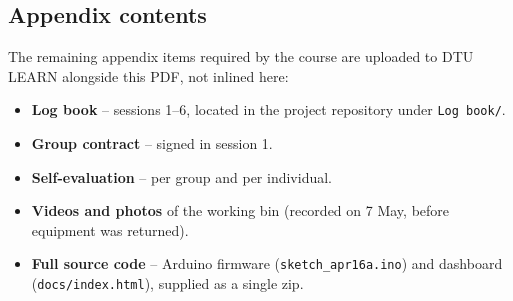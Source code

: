 \documentclass{article}
\begin{document}
\subsection*{Appendix contents}

The remaining appendix items required by the course are uploaded to DTU LEARN alongside this PDF, not inlined here:

\begin{itemize}
    \item \textbf{Log book} -- sessions 1--6, located in the project repository under \texttt{Log book/}.
    \item \textbf{Group contract} -- signed in session 1.
    \item \textbf{Self-evaluation} -- per group and per individual.
    \item \textbf{Videos and photos} of the working bin (recorded on 7 May, before equipment was returned).
    \item \textbf{Full source code} -- Arduino firmware (\texttt{sketch\_apr16a.ino}) and dashboard (\texttt{docs/index.html}), supplied as a single zip.
\end{itemize}

\ifdefined\mainfile\else
\end{document}
